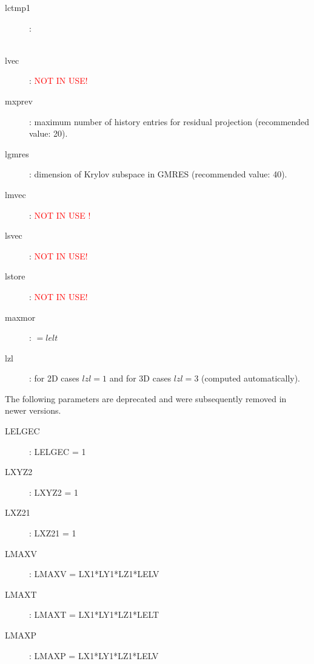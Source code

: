 \begin{description}
\item [lctmp1] : \\
\\
\item [lvec] : {\textcolor{red}{NOT IN USE!}}
\item [mxprev]: maximum number of history entries for residual projection (recommended value: 20).
\item [lgmres]: dimension of Krylov subspace in GMRES (recommended value: 40).
\item [lmvec] : {\textcolor{red}{NOT IN USE !}}
\item [lsvec] : {\textcolor{red}{NOT IN USE!}}
\item [lstore] : {\textcolor{red}{NOT IN USE!}}
\item [maxmor] : \(=lelt\)
\item [lzl]: for 2D cases \(lzl=1\) and for 3D cases \(lzl=3\) (computed automatically).
\end{description}

The following parameters are deprecated and were subsequently removed in newer versions.
\begin{description}
\item [LELGEC] : LELGEC = 1 
\item [LXYZ2] : LXYZ2 = 1 
\item [LXZ21] : LXZ21 = 1 
\item [LMAXV] : LMAXV = LX1*LY1*LZ1*LELV 
\item [LMAXT] : LMAXT = LX1*LY1*LZ1*LELT 
\item [LMAXP] : LMAXP = LX1*LY1*LZ1*LELV 
\end{description}

